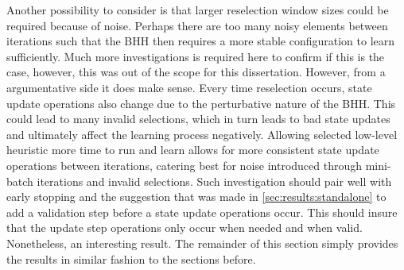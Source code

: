 Another possibility to consider is that larger reselection window sizes could be required because of noise. Perhaps there are too many noisy elements between iterations such that the \Ac{BHH} then requires a more stable configuration to learn sufficiently. Much more investigations is required here to confirm if this is the case, however, this was out of the scope for this dissertation. However, from a argumentative side it does make sense. Every time reselection occurs, state update operations also change due to the perturbative nature of the \Ac{BHH}. This could lead to many invalid selections, which in turn leads to bad state updates and ultimately affect the learning process negatively. Allowing selected low-level heuristic more time to run and learn allows for more consistent state update operations between iterations, catering best for noise introduced through mini-batch iterations and invalid selections.  Such investigation should pair well with early stopping and the suggestion that was made in \ref{sec:results:standalone} to add a validation step before a state update operations occur. This should insure that the update step operations only occur when needed and when valid. Nonetheless, an interesting result. The remainder of this section simply provides the results in similar fashion to the sections before. 

